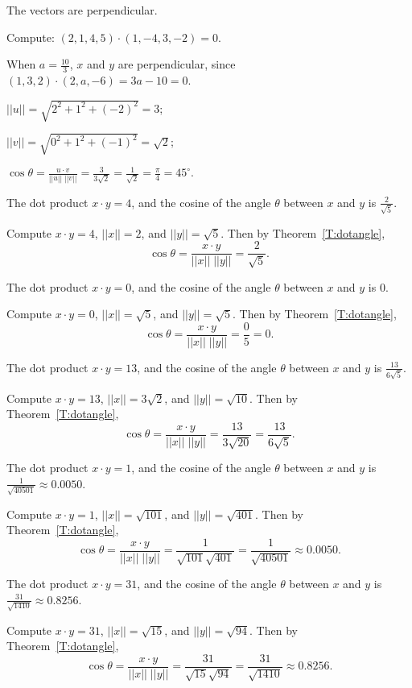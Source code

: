 \documentclass{ximera}
\begin{document}
 \ans The vectors are perpendicular.

\soln Compute: $(2,1,4,5) \cdot (1,-4,3,-2) = 0$.

When $a = \frac{10}{3}$, $x$ and $y$ are perpendicular, since
$(1,3,2) \cdot (2,a,-6) = 3a - 10 = 0$.

$||u||  =  \sqrt{2^2 + 1^2 + (-2)^2}  =  3$;

$||v||  =  \sqrt{0^2 + 1^2 + (-1)^2}  =  \sqrt{2}$;

$
\cos \theta = \frac{u \cdot v}{||u||\;||v||}  =  \frac{3}{3\sqrt{2}} =
\frac{1}{\sqrt{2}} = \frac{\pi}{4} = 45^\circ.
$

 \ans The dot product $x \cdot y = 4$, and the cosine
of the angle $\theta$ between $x$ and $y$ is $\frac{2}{\sqrt{5}}$.

\soln Compute $x \cdot y = 4$, $||x|| = 2$, and $||y|| = \sqrt{5}$.
Then by Theorem~\ref{T:dotangle},
\[
\cos\theta = \frac{x \cdot y}{||x||\;||y||} = \frac{2}{\sqrt{5}}.
\]

 \ans The dot product $x \cdot y = 0$, and the cosine
of the angle $\theta$ between $x$ and $y$ is $0$.

\soln Compute $x \cdot y = 0$, $||x|| = \sqrt{5}$, and $||y|| = \sqrt{5}$.
Then by Theorem~\ref{T:dotangle},
\[
\cos\theta = \frac{x \cdot y}{||x||\;||y||} = \frac{0}{5}
= 0.
\]

 \ans The dot product $x \cdot y = 13$, and the cosine
of the angle $\theta$ between $x$ and $y$ is $\frac{13}{6\sqrt{5}}$.

\soln Compute $x \cdot y = 13$, $||x|| = 3\sqrt{2}$, and $||y|| = \sqrt{10}$.
Then by Theorem~\ref{T:dotangle},
\[
\cos\theta = \frac{x \cdot y}{||x||\;||y||} = \frac{13}{3\sqrt{20}}
= \frac{13}{6\sqrt{5}}.
\]

 \ans The dot product $x \cdot y = 1$, and the cosine
of the angle $\theta$ between $x$ and $y$ is
$\frac{1}{\sqrt{40501}} \approx 0.0050$.

\soln Compute $x \cdot y = 1$, $||x|| = \sqrt{101}$, and $||y|| = \sqrt{401}$.
Then by Theorem~\ref{T:dotangle},
\[
\cos\theta = \frac{x \cdot y}{||x||\;||y||} = \frac{1}{\sqrt{101}\sqrt{401}}
= \frac{1}{\sqrt{40501}} \approx 0.0050.
\]

 \ans The dot product $x \cdot y = 31$, and the cosine
of the angle $\theta$ between $x$ and $y$ is
$\frac{31}{\sqrt{1410}} \approx 0.8256$.

\soln Compute $x \cdot y = 31$, $||x|| = \sqrt{15}$, and $||y|| = \sqrt{94}$.
Then by Theorem~\ref{T:dotangle},
\[
\cos\theta = \frac{x \cdot y}{||x||\;||y||} = \frac{31}{\sqrt{15}\sqrt{94}}
= \frac{31}{\sqrt{1410}} \approx 0.8256.
\]
\end{document}
